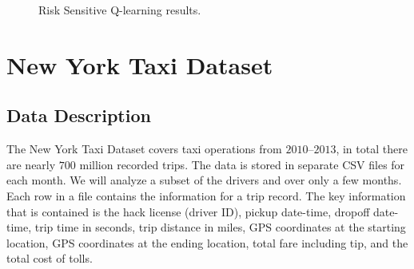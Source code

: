 \documentclass{article}
\begin{document}
\begin{figure}[H]
    \centering
    \hfill
    \caption{Risk Sensitive Q-learning results.}
    \label{fig:sim}
\end{figure}


\section{New York Taxi Dataset}
\subsection{Data Description}
The New York Taxi Dataset covers taxi operations from $2010$--$2013$, in total there are nearly $700$ million recorded trips. The data is stored in separate CSV files for each month. We will analyze a subset of the drivers and over only a few months. Each row in a file contains the information for a trip record. The key information that is contained is the hack license (driver ID), pickup date-time, dropoff date-time, trip time in seconds, trip distance in miles, GPS coordinates at the starting location, GPS coordinates at the ending location, total fare including tip, and the total cost of tolls.
\end{document}

